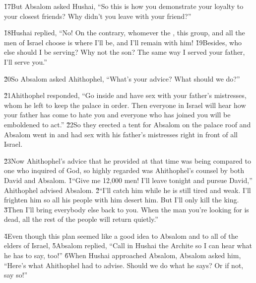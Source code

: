 \v{17}But Absalom asked Hushai, ``So this is how you demonstrate your loyalty to your closest friends? Why didn't you leave with your friend?''

\v{18}Hushai replied, ``No! On the contrary, whomever the , this group, and all the men of Israel choose is where I'll be, and I'll remain with him! \v{19}Besides, who else should I be serving? Why not the son? The same way I served your father, I'll serve you.''

\v{20}So Absalom asked Ahithophel, ``What's your advice? What should we do?''

\v{21}Ahithophel responded, ``Go inside and have sex with your father's mistresses, whom he left to keep the palace in order. Then everyone in Israel will hear how your father has come to hate you and everyone who has joined you will be emboldened to act.'' \v{22}So they erected a tent for Absalom on the palace roof and Absalom went in and had sex with his father's mistresses right in front of all Israel.

\v{23}Now Ahithophel's advice that he provided at that time was being compared to one who inquired of God, so highly regarded was Ahithophel's counsel by both David and Absalom.
\v{1}``Give me 12,000 men! I'll leave tonight and pursue David,'' Ahithophel advised Absalom. \v{2}``I'll catch him while he is still tired and weak. I'll frighten him so all his people with him desert him. But I'll only kill the king. \v{3}Then I'll bring everybody else back to you. When the man you're looking for is dead, all the rest of the people will return quietly.''

\v{4}Even though this plan seemed like a good idea to Absalom and to all of the elders of Israel, \v{5}Absalom replied, ``Call in Hushai the Archite so I can hear what he has to say, too!'' \v{6}When Hushai approached Absalom, Absalom asked him, ``Here's what Ahithophel had to advise. Should we do what he says? Or if not, say so!''

